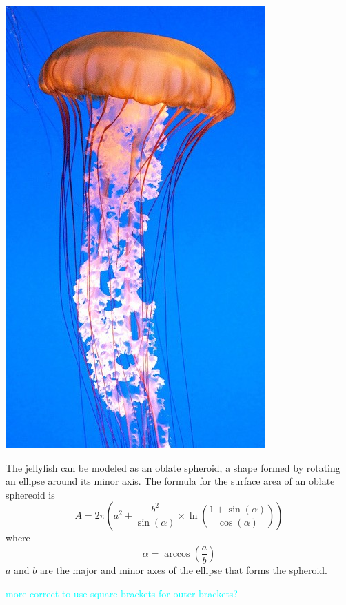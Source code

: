 \documentclass[fleqn]{article}
\newcommand\ask[1]{\textcolor{cyan}{#1}}
\begin{document}
\includegraphics{chrysaora-fuscescens.jpg}

The jellyfish can be modeled as an oblate spheroid, a shape formed by rotating an ellipse around its minor axis. The formula for the surface area of an oblate sphereoid is
\begin{equation*}
  A = 2\pi\left(a^2+\frac{b^2}{\sin(\alpha)}\times\ln\left(\frac{1+\sin(\alpha)}{\cos(\alpha)}\right)\right)
\end{equation*}
where
\begin{equation*}
  \alpha=\arccos\left(\frac{a}{b}\right)
\end{equation*}
$a$ and $b$ are the major and minor axes of the ellipse that forms the spheroid.

\ask{more correct to use square brackets for outer brackets?}
\end{document}
